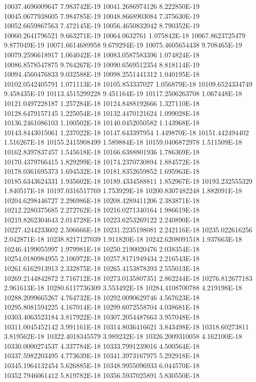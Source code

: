 10037.4696009647  7.983742E-19
10041.2686974126  8.222850E-19
10045.0677938605  7.984785E-19
10048.8668903084  7.375630E-19
10052.6659867563  7.472145E-19
10056.4650832042  8.790352E-19
10060.2641796521  9.663271E-19
10064.0632761  1.075842E-18
10067.8623725479  9.877049E-19
10071.6614689958  9.679294E-19
10075.4605654438  9.708465E-19
10079.2596618917  1.064042E-18
10083.0587583396  1.074824E-18
10086.8578547875  9.764267E-19
10090.6569512354  8.818114E-19
10094.4560476833  9.032588E-19
10098.2551441312  1.040195E-18
10102.0542405791  1.071113E-18
10105.853337027  1.056879E-18
10109.6524334749  9.458435E-19
10113.4515299228  9.451164E-19
10117.2506263708  1.067448E-18
10121.0497228187  1.257284E-18
10124.8488192666  1.327110E-18
10128.6479157145  1.225054E-18
10132.4470121624  1.099028E-18
10136.2461086103  1.100502E-18
10140.0452050582  1.143968E-18
10143.8443015061  1.237022E-18
10147.643397954  1.449870E-18
10151.442494402  1.516267E-18
10155.2415908499  1.589884E-18
10159.0406872978  1.511509E-18
10162.8397837457  1.545618E-18
10166.6388801936  1.786369E-18
10170.4379766415  1.829299E-18
10174.2370730894  1.884572E-18
10178.0361695373  1.694532E-18
10181.8352659852  1.695963E-18
10185.6343624331  1.935602E-18
10189.4334588811  1.852967E-18
10193.232555329  1.840517E-18
10197.0316517769  1.753929E-18
10200.8307482248  1.882091E-18
10204.6298446727  2.296986E-18
10208.4289411206  2.383871E-18
10212.2280375685  2.272762E-18
10216.0271340164  1.986619E-18
10219.8262304643  2.014728E-18
10223.6253269122  2.240890E-18
10227.4244233602  2.506666E-18
10231.2235198081  2.242116E-18
10235.022616256  2.042871E-18
10238.8217127039  1.911820E-18
10242.6208091518  1.937663E-18
10246.4199055997  1.979981E-18
10250.2190020476  2.038354E-18
10254.0180984955  2.106972E-18
10257.8171949434  2.216543E-18
10261.6162913913  2.332875E-18
10265.4153878393  2.555013E-18
10269.2144842872  2.716712E-18
10273.0135807351  2.862244E-18
10276.812677183  2.961613E-18
10280.6117736309  3.553492E-18
10284.4108700788  4.219198E-18
10288.2099665267  4.764732E-18
10292.0090629746  4.567623E-18
10295.8081594225  4.167014E-18
10299.6072558704  4.038681E-18
10303.4063523184  3.817922E-18
10307.2054487663  3.957048E-18
10311.0045452142  3.991161E-18
10314.8036416621  3.843498E-18
10318.60273811  3.819562E-18
10322.4018345579  3.989232E-18
10326.2009310058  4.162100E-18
10330.0000274537  4.337784E-18
10333.7991239016  4.500564E-18
10337.5982203495  4.773639E-18
10341.3973167975  5.292918E-18
10345.1964132454  5.626885E-18
10348.9955096933  6.044570E-18
10352.7946061412  5.819782E-18
10356.5937025891  5.830550E-18
